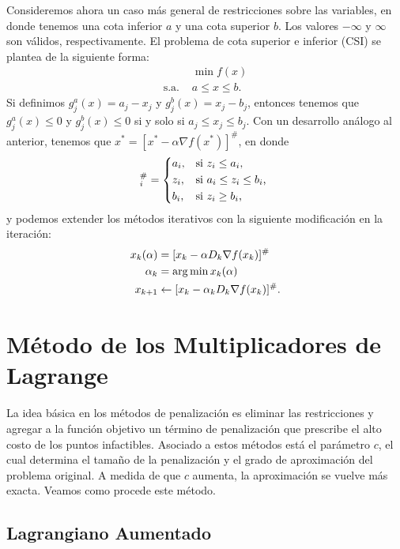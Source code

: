 Consideremos ahora un caso más general de restricciones sobre las variables, en donde tenemos una cota inferior \(a\) y una cota superior \(b\). Los valores \(-\infty \) y \(\infty \) son válidos, respectivamente. El problema de cota superior e inferior (CSI) se plantea de la siguiente forma:
\begin{align*}
					& \min f(x) \\
	\text{s.a. }	& a \leq x \leq b.
\end{align*}
Si definimos \(g_{j}^{a}(x) = a_{j} - x_{j}\) y \(g_{j}^{b}(x) = x_{j} - b_{j}\), entonces tenemos que \(g_{j}^{a}(x) \leq 0\) y \(g_{j}^{b}(x) \leq 0\) si y solo si \(a_{j} \leq x_{j} \leq b_{j}\). Con un desarrollo análogo al anterior, tenemos que \(x^{\ast} = [x^{\ast} - \alpha \nabla f(x^{\ast})]^{\#}\), en donde
\begin{equation*}
	[z]_i^{\#} = \begin{dcases*}
		a_{i},	& si \(z_{i} \leq a_{i}\), \\
		z_{i},	& si \(a_{i} \leq z_{i}\leq b_{i}\), \\
		b_{i},	& si \(z_{i} \geq b_{i}\),
	\end{dcases*}
\end{equation*}
y podemos extender los métodos iterativos con la siguiente modificación en la iteración:
\begin{align*}
	x_{k}(\alpha)	&= [x_{k} - \alpha D_{k} \nabla f(x_{k})]^{\#} \\
	\alpha_{k}		&= \operatorname*{\arg\min} x_{k}(\alpha) \\
	x_{k+1}			& \gets [x_{k} - \alpha_{k} D_{k} \nabla f(x_{k})]^{\#}.
\end{align*}

\section{Método de los Multiplicadores de Lagrange}

La idea básica en los métodos de penalización es eliminar las restricciones y agregar a la función objetivo un término de penalización que prescribe el alto costo de los puntos infactibles. Asociado a estos métodos está el parámetro \(c\), el cual determina el tamaño de la penalización y el grado de aproximación del problema original. A medida de que \(c\) aumenta, la aproximación se vuelve más exacta. Veamos como procede este método.

\subsection{Lagrangiano Aumentado}

